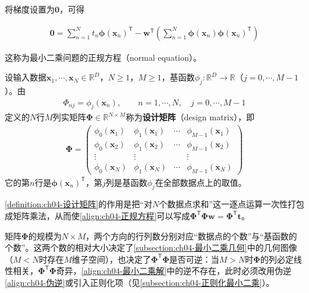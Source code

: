 \documentclass[../../main.tex]{subfiles}
\begin{document}
将梯度设置为$\boldsymbol{0}$，可得

\begin{align}
  \boldsymbol{0}=\sum_{n=1}^{N}t_n\boldsymbol{\phi}(\boldsymbol{x}_n)^{\mathsf{T}}
  -\boldsymbol{w}^{\mathsf{T}}\left(\sum_{n=1}^{N}\boldsymbol{\phi}(\boldsymbol{x}_n)\boldsymbol{\phi}(\boldsymbol{x}_n)^{\mathsf{T}}\right)
  \label{align:ch04-正规方程}
\end{align}

这称为最小二乘问题的正规方程（normal equation）。

\begin{definition}[设计矩阵]\label{definition:ch04-设计矩阵}
设输入数据$\boldsymbol{x}_1,\cdots,\boldsymbol{x}_N\in\mathbb{R}^{D}$，$N\geqslant1$，$M\geqslant1$，基函数$\phi_j:\mathbb{R}^{D}\to\mathbb{R}$（$j=0,\cdots,M-1$）。由
\begin{align}
  \Phi_{nj}=\phi_j(\boldsymbol{x}_n),\qquad n=1,\cdots,N,\quad j=0,\cdots,M-1
  \label{align:ch04-设计矩阵元}
\end{align}
定义的$N$行$M$列实矩阵$\boldsymbol{\Phi}\in\mathbb{R}^{N\times M}$称为\textbf{设计矩阵}（design matrix），即
\begin{align}
  \boldsymbol{\Phi}=
  \begin{pmatrix}
    \phi_0(\boldsymbol{x}_1) & \phi_1(\boldsymbol{x}_1) & \cdots & \phi_{M-1}(\boldsymbol{x}_1)\\
    \phi_0(\boldsymbol{x}_2) & \phi_1(\boldsymbol{x}_2) & \cdots & \phi_{M-1}(\boldsymbol{x}_2)\\
    \vdots & \vdots & & \vdots\\
    \phi_0(\boldsymbol{x}_N) & \phi_1(\boldsymbol{x}_N) & \cdots & \phi_{M-1}(\boldsymbol{x}_N)
  \end{pmatrix}
  \label{align:ch04-设计矩阵}
\end{align}
它的第$n$行是$\boldsymbol{\phi}(\boldsymbol{x}_n)^{\mathsf{T}}$，第$j$列是基函数$\phi_j$在全部数据点上的取值。
\end{definition}

\begin{remark}
\cref{definition:ch04-设计矩阵}的作用是把“对$N$个数据点求和”这一逐点运算一次性打包成矩阵乘法，从而使\eqref{align:ch04-正规方程}可以写成$\boldsymbol{\Phi}^{\mathsf{T}}\boldsymbol{\Phi}\boldsymbol{w}=\boldsymbol{\Phi}^{\mathsf{T}}\boldsymbol{t}$。

矩阵$\boldsymbol{\Phi}$的规模为$N\times M$，两个方向的行列数分别对应“数据点的个数”与“基函数的个数”。这两个数的相对大小决定了\cref{subsection:ch04-最小二乘几何}中的几何图像（$M<N$时存在$M$维子空间），也决定了$\boldsymbol{\Phi}^{\mathsf{T}}\boldsymbol{\Phi}$是否可逆：当$M>N$时$\boldsymbol{\Phi}$的列必定线性相关，$\boldsymbol{\Phi}^{\mathsf{T}}\boldsymbol{\Phi}$奇异，\eqref{align:ch04-最小二乘解}中的逆不存在，此时必须改用伪逆\eqref{align:ch04-伪逆}或引入正则化项（见\cref{subsection:ch04-正则化最小二乘}）。
\end{remark}
\end{document}
